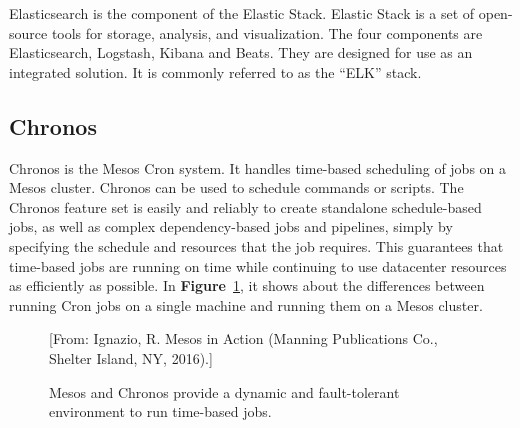 \documentclass[12pt,oneside,openright,a4paper]{cpe-english-project}
\begin{document}
\hspace{10mm}Elasticsearch is the component of the Elastic Stack. Elastic Stack is a set of open-source tools for storage, analysis, and visualization. The four components are Elasticsearch, Logstash, Kibana and Beats. They are designed for use as an integrated solution. It is commonly referred to as the “ELK” stack.\cite{elasticsearch}

\subsection{Chronos}

\hspace{10mm}Chronos is the Mesos Cron system. It handles time-based scheduling of jobs on a Mesos cluster. Chronos can be used to schedule commands or scripts. The Chronos feature set is easily and reliably to create standalone schedule-based jobs, as well as complex dependency-based jobs and pipelines, simply by specifying the schedule and resources that the job requires. This guarantees that time-based jobs are running on time while continuing to use datacenter resources as efficiently as possible. In \textbf{Figure}~\ref{fig:chronos}, it shows about the differences between running Cron jobs on a single machine and running them on a Mesos cluster.\cite{mesosInAction}

\begin{figure}[!h]\centering
  \setlength{\fboxrule}{0mm} %
  \setlength{\fboxsep}{0cm}
  \caption{Mesos and Chronos provide a dynamic and fault-tolerant environment to run time-based jobs.}\label{fig:chronos}
  [From: Ignazio, R. Mesos in Action (Manning Publications Co., Shelter Island, NY, 2016).]
\end{figure}
\end{document}
